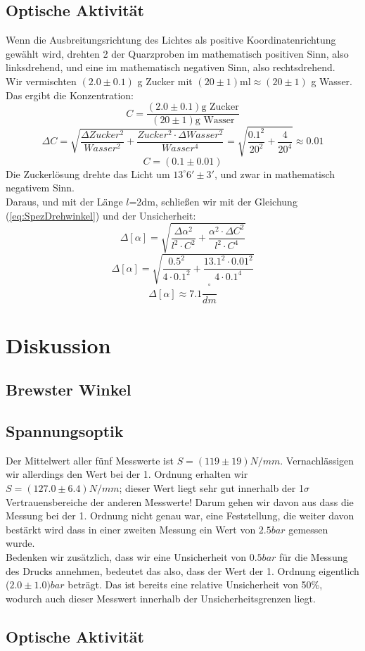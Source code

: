 \documentclass[twoside]{article}
\begin{document}
\subsection{Optische Aktivität}
Wenn die Ausbreitungsrichtung des Lichtes als positive Koordinatenrichtung gewählt wird, drehten 2 der Quarzproben im mathematisch positiven Sinn, also linksdrehend, und eine im mathematisch negativen Sinn, also rechtsdrehend.\\
Wir vermischten $(2.0 \pm 0.1)$ g Zucker mit $(20 \pm 1)\text{ml} \approx (20 \pm 1)$ g Wasser. Das ergibt die Konzentration:
$$C=\frac{(2.0 \pm 0.1) \text{g Zucker}}{(20 \pm 1) \text{g Wasser}}$$
$$\Delta C= \sqrt{\frac{\Delta Zucker^2}{Wasser^2}+\frac{Zucker^2 \cdot \Delta Wasser^2}{Wasser^4}} = \sqrt{\frac{0.1^2}{20^2}+\frac{4}{20^4}}\approx 0.01$$
\vspace{0.5cm}
$$C=(0.1\pm0.01)$$
Die Zuckerlösung drehte das Licht um $13^\circ 6' \pm 3'$, und zwar in mathematisch negativem Sinn. \\
Daraus, und mit der Länge $l$=2dm, schließen wir mit der Gleichung (\ref{eq:SpezDrehwinkel}) und der Unsicherheit:
$$\Delta [\alpha] = \sqrt{\frac{\Delta \alpha^2}{l^2\cdot C^2}+\frac{\alpha^2 \cdot \Delta C ^2}{l^2\cdot C^4}}$$
$$\Delta [\alpha] = \sqrt{\frac{0.5^2}{4\cdot 0.1^2}+\frac{13.1^2\cdot 0.01^2}{4 \cdot 0.1^4}}$$
$$\Delta [\alpha] \approx 7.1 \frac{^\circ}{dm}$$

\begin{center}
\end{center}
\section{Diskussion}
\subsection{Brewster Winkel}
\subsection{Spannungsoptik}

Der Mittelwert aller fünf Messwerte ist $S=(119 \pm 19)\si{N/mm}$. Vernachlässigen wir allerdings den Wert bei der 1. Ordnung erhalten wir $S=(127.0 \pm 6.4)\si{N/mm}$; dieser Wert liegt sehr gut innerhalb der 1$\sigma$ Vertrauensbereiche der anderen Messwerte! Darum gehen wir davon aus dass die Messung bei der 1. Ordnung nicht genau war, eine Feststellung, die weiter davon bestärkt wird dass in einer zweiten Messung ein Wert von $2.5 \si{bar}$ gemessen wurde.\\
Bedenken wir zusätzlich, dass wir eine Unsicherheit von $0.5 \si{bar}$ für die Messung des Drucks annehmen, bedeutet das also, dass der Wert der 1. Ordnung eigentlich ($2.0 \pm 1.0)\si{bar}$ beträgt. Das ist bereits eine relative Unsicherheit von 50\%, wodurch auch dieser Messwert innerhalb der Unsicherheitsgrenzen liegt. 

\subsection{Optische Aktivität}
																					
\end{document}
